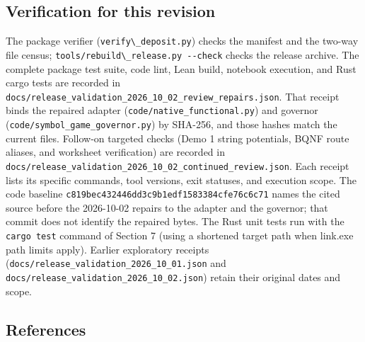 \documentclass[
  11pt,
]{article}
\newcommand{\passthrough}[1]{#1}
\begin{document}
\subsection{Verification for this
revision}\label{verification-for-this-revision}

The package verifier (\passthrough{\lstinline!verify\_deposit.py!})
checks the manifest and the two-way file census;
\passthrough{\lstinline!tools/rebuild\_release.py --check!} checks the
release archive. The complete package test suite, code lint, Lean build,
notebook execution, and Rust cargo tests are recorded in
\nolinkurl{docs/release_validation_2026_10_02_review_repairs.json}. That
receipt binds the repaired adapter
(\nolinkurl{code/native_functional.py}) and governor
(\nolinkurl{code/symbol_game_governor.py}) by SHA-256, and those hashes
match the current files. Follow-on targeted checks (Demo 1 string
potentials, BQNF route aliases, and worksheet verification) are recorded
in \nolinkurl{docs/release_validation_2026_10_02_continued_review.json}.
Each receipt lists its specific commands, tool versions, exit statuses,
and execution scope. The code baseline
\nolinkurl{c819bec432446dd3c9b1edf1583384cfe76c6c71} names the cited
source before the 2026-10-02 repairs to the adapter and the governor;
that commit does not identify the repaired bytes. The Rust unit tests
run with the \passthrough{\lstinline!cargo test!} command of Section 7
(using a shortened target path when link.exe path limits apply). Earlier
exploratory receipts
(\nolinkurl{docs/release_validation_2026_10_01.json} and
\nolinkurl{docs/release_validation_2026_10_02.json}) retain their
original dates and scope.

\subsection{References}\label{references}
\end{document}

